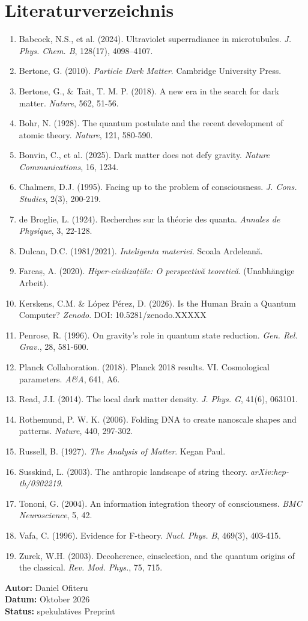 \documentclass[11pt,a4paper]{article}
\begin{document}
\section*{Literaturverzeichnis}
\begin{enumerate}
    \item Babcock, N.S., et al. (2024). Ultraviolet superradiance in microtubules. \textit{J. Phys. Chem. B}, 128(17), 4098--4107.
    \item Bertone, G. (2010). \textit{Particle Dark Matter}. Cambridge University Press.
    \item Bertone, G., \& Tait, T. M. P. (2018). A new era in the search for dark matter. \textit{Nature}, 562, 51-56.
    \item Bohr, N. (1928). The quantum postulate and the recent development of atomic theory. \textit{Nature}, 121, 580-590.
    \item Bonvin, C., et al. (2025). Dark matter does not defy gravity. \textit{Nature Communications}, 16, 1234.
    \item Chalmers, D.J. (1995). Facing up to the problem of consciousness. \textit{J. Cons. Studies}, 2(3), 200-219.
    \item de Broglie, L. (1924). Recherches sur la théorie des quanta. \textit{Annales de Physique}, 3, 22-128.
    \item Dulcan, D.C. (1981/2021). \textit{Inteligenta materiei}. Scoala Ardeleană.
    \item Farcaș, A. (2020). \textit{Hiper-civilizațiile: O perspectivă teoretică}. (Unabhängige Arbeit).
    \item Kerskens, C.M. \& López Pérez, D. (2026). Is the Human Brain a Quantum Computer? \textit{Zenodo}. DOI: 10.5281/zenodo.XXXXX
    \item Penrose, R. (1996). On gravity's role in quantum state reduction. \textit{Gen. Rel. Grav.}, 28, 581-600.
    \item Planck Collaboration. (2018). Planck 2018 results. VI. Cosmological parameters. \textit{A\&A}, 641, A6.
    \item Read, J.I. (2014). The local dark matter density. \textit{J. Phys. G}, 41(6), 063101.
    \item Rothemund, P. W. K. (2006). Folding DNA to create nanoscale shapes and patterns. \textit{Nature}, 440, 297-302.
    \item Russell, B. (1927). \textit{The Analysis of Matter}. Kegan Paul.
    \item Susskind, L. (2003). The anthropic landscape of string theory. \textit{arXiv:hep-th/0302219}.
    \item Tononi, G. (2004). An information integration theory of consciousness. \textit{BMC Neuroscience}, 5, 42.
    \item Vafa, C. (1996). Evidence for F-theory. \textit{Nucl. Phys. B}, 469(3), 403-415.
    \item Zurek, W.H. (2003). Decoherence, einselection, and the quantum origins of the classical. \textit{Rev. Mod. Phys.}, 75, 715.
\end{enumerate}

\vspace{1cm}
\begin{flushright}
\textbf{Autor:} Daniel Ofiteru \\
\textbf{Datum:} Oktober 2026 \\
\textbf{Status:} spekulatives Preprint
\end{flushright}
\end{document}
